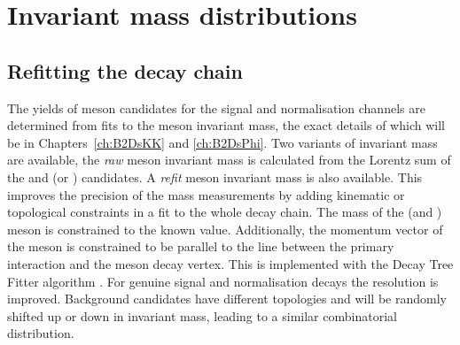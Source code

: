

\section{Invariant mass distributions}
\label{sec:invarinantmassdistros}

\subsection{Refitting the decay chain}
\label{sec:decaytreefitter}

The yields of \Bp meson candidates for the signal and normalisation channels are determined from fits to the \Bp meson invariant mass, the exact details of which will be in Chapters~\ref{ch:B2DsKK} and \ref{ch:B2DsPhi}.
Two variants of invariant mass are available, the \emph{raw} \Bp meson invariant mass is calculated from the Lorentz sum of the \Dsp and \phiz (or \Dzb) candidates.
A \emph{refit} \Bp meson invariant mass is also available. This improves the precision of the mass measurements by adding kinematic or topological constraints in a fit to the whole decay chain. 
The mass of the \Dsp  (and \Dzb) meson is constrained to the known value. Additionally, the momentum vector of the \Bp meson is constrained to be parallel to the line between the primary interaction and the \Bp meson decay vertex. 
This is implemented with the Decay Tree Fitter algorithm \cite{Hulsbergen:2005pu}.
For genuine signal and normalisation decays the resolution is improved.
Background candidates have different topologies and will be randomly shifted up or down in invariant mass, leading to a similar combinatorial distribution.    


